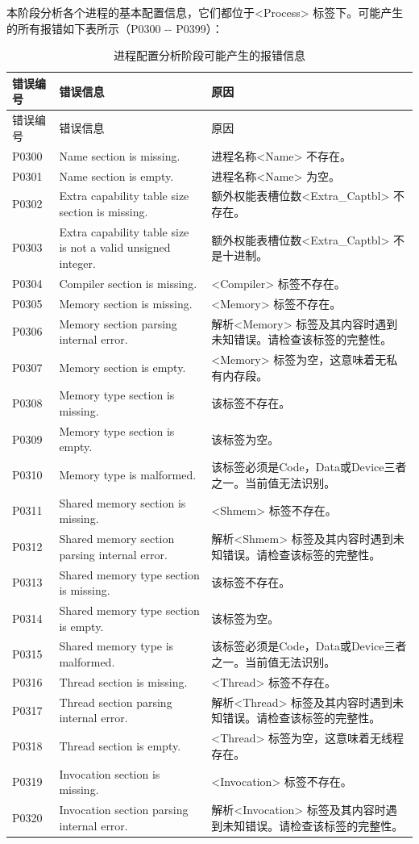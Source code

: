 本阶段分析各个进程的基本配置信息，它们都位于<Process> 标签下。可能产生的所有报错如下表所示（P0300
-\/- P0399）：

\begin{xltabular}{\textwidth}{@{}>{\hsize\raggedright\arraybackslash}X>{\hsize\raggedright\arraybackslash}X>{\hsize\raggedright\arraybackslash}X@{}}
\caption{进程配置分析阶段可能产生的报错信息}\label{tab:5-6}\\
\toprule
错误编号 & 错误信息 & 原因\tabularnewline
\endfirsthead
\toprule
错误编号 & 错误信息 & 原因\tabularnewline
\midrule
\endhead
\bottomrule
\endlastfoot
P0300 & Name section is missing. &
进程名称<Name> 不存在。\tabularnewline
P0301 & Name section is empty. &
进程名称<Name> 为空。\tabularnewline
P0302 & Extra capability table size section is missing. &
额外权能表槽位数<Extra\_\allowbreak{}Captbl> 不存在。\tabularnewline
P0303 & Extra capability table size is not a valid unsigned integer. &
额外权能表槽位数<Extra\_\allowbreak{}Captbl> 不是十进制。\tabularnewline
P0304 & Compiler section is missing. &
<Compiler> 标签不存在。\tabularnewline
P0305 & Memory section is missing. &
<Memory> 标签不存在。\tabularnewline
P0306 & Memory section parsing internal error. &
解析<Memory> 标签及其内容时遇到未知错误。请检查该标签的完整性。\tabularnewline
P0307 & Memory section is empty. &
<Memory> 标签为空，这意味着无私有内存段。\tabularnewline
P0308 & Memory type section is missing. & 该标签不存在。\tabularnewline
P0309 & Memory type section is empty. & 该标签为空。\tabularnewline
P0310 & Memory type is malformed. & 该标签必须是Code，Data或Device三者之一。当前值无法识别。\tabularnewline
P0311 & Shared memory section is missing. &
<Shmem> 标签不存在。\tabularnewline
P0312 & Shared memory section parsing internal error. &
解析<Shmem> 标签及其内容时遇到未知错误。请检查该标签的完整性。\tabularnewline
P0313 & Shared memory type section is missing. & 该标签不存在。\tabularnewline
P0314 & Shared memory type section is empty. & 该标签为空。\tabularnewline
P0315 & Shared memory type is malformed. & 该标签必须是Code，Data或Device三者之一。当前值无法识别。\tabularnewline
P0316 & Thread section is missing. &
<Thread> 标签不存在。\tabularnewline
P0317 & Thread section parsing internal error. &
解析<Thread> 标签及其内容时遇到未知错误。请检查该标签的完整性。\tabularnewline
P0318 & Thread section is empty. &
<Thread> 标签为空，这意味着无线程存在。\tabularnewline
P0319 & Invocation section is missing. &
<Invocation> 标签不存在。\tabularnewline
P0320 & Invocation section parsing internal error. &
解析<Invocation> 标签及其内容时遇到未知错误。请检查该标签的完整性。\tabularnewline

\end{xltabular}
